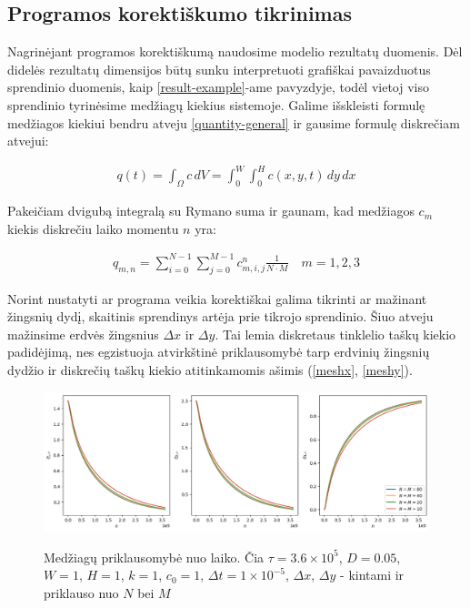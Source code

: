 \newpage
\subsection{Programos korektiškumo tikrinimas}


Nagrinėjant programos korektiškumą naudosime modelio rezultatų duomenis. Dėl didelės rezultatų dimensijos būtų sunku interpretuoti grafiškai pavaizduotus sprendinio duomenis, kaip \ref{result-example}-ame pavyzdyje, todėl vietoj viso sprendinio tyrinėsime medžiagų kiekius sistemoje. Galime išskleisti formulę medžiagos kiekiui bendru atveju \eqref{quantity-general} ir gausime formulę diskrečiam atvejui:

\begin{align}
    q(t) = \int_\Omega c\,dV = \int_0^W \int_0^H c(x, y, t)\,dy\,dx
\end{align}

Pakeičiam dvigubą integralą su Rymano suma ir gaunam, kad medžiagos $c_m$ kiekis diskrečiu laiko momentu $n$ yra:

\begin{align}
    q_{m, n}= \sum_{i=0}^{N-1}\sum_{j=0}^{M-1} c_{m, i,j}^n \frac{1}{N\cdot M} \quad m=1, 2, 3
\end{align}


Norint nustatyti ar programa veikia korektiškai galima tikrinti ar mažinant žingsnių dydį, skaitinis sprendinys artėja prie tikrojo sprendinio. Šiuo atveju mažinsime erdvės žingsnius $\Delta x$ ir $\Delta y$. Tai lemia diskretaus tinklelio taškų kiekio padidėjimą, nes egzistuoja atvirkštinė priklausomybė tarp erdvinių žingsnių dydžio ir diskrečių taškų kiekio atitinkamomis ašimis (\ref{meshx}, \ref{meshy}).

\begin{figure}[h!]
    \centering
    \includegraphics[width=\textwidth]{../assets/space-error-v2.png} \\
    \caption{Medžiagų priklausomybė nuo laiko. Čia $\tau=3.6\times 10^5$, $D=0.05$, $W = 1$, $H=1$, $k = 1$, $c_0 = 1$, $\Delta t = 1\times 10^{-5}$, $\Delta x$, $\Delta y$ - kintami ir priklauso nuo $N$ bei $M$ }
\end{figure}

